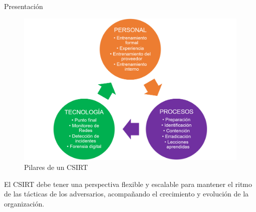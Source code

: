 \begin{section}{Presentación}
        \begin{figure}[H]
            \centering
            \includegraphics[width=1\textwidth]{./marco_teorico_imagenes/figura_1_pilares.png}
            \caption{Pilares de un CSIRT}
            \label{fig:pilares}
        \end{figure}
        \FloatBarrier
        El CSIRT debe tener una perspectiva flexible y escalable para mantener el ritmo de las tácticas de los adversarios, acompañando el crecimiento y evolución de la organización. \par
    \end{section}
    

